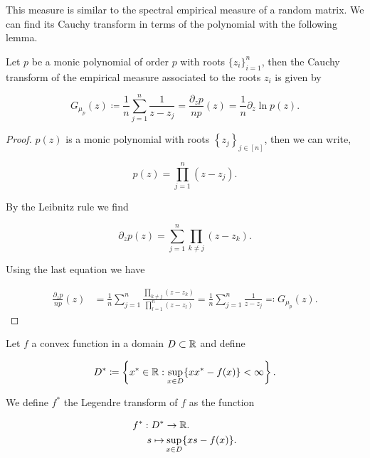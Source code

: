 This measure is similar to the spectral empirical measure of a random matrix. We can find its Cauchy transform in terms of the polynomial with the following lemma.

\begin{lemma} \label{lemma:cauchy_empirical_polynomial}
    Let $p$ be a monic polynomial of order $p$ with roots $\{z_i\}_{i=1}^n$, then the Cauchy transform of the empirical measure associated to the roots $z_i$ is given by 

    \begin{equation*}
        G_{\mu_p}(z) \coloneqq \frac1n \sum_{j=1}^n \frac1{z - z_j} = \frac{\partial_z p }{n p}(z) = \frac1n \partial_z \ln p(z).
    \end{equation*}

\end{lemma}

\begin{proof}
    $p(z)$ is a monic polynomial with roots $\left\{ z_j \right\}_{j \in [n]}$, then we can write,

    \begin{equation*}
        p(z) = \prod_{j=1}^n (z-z_j).
    \end{equation*}

    By the Leibnitz rule we find

    \begin{equation*}
        \partial_z p(z) = \sum_{j=1}^n \prod_{k\neq j} (z-z_k).
    \end{equation*}

    Using the last equation we have

    \begin{align*}
        \frac{\partial_z p}{n p}(z) &= \frac1n\sum_{j=1}^n \frac{\prod_{k\neq j} (z-z_k) }{ \prod_{l=1}^n (z-z_l) } = \frac1n\sum_{j=1}^n \frac{1}{z - z_j} \eqqcolon G_{\mu_p}(z).
    \end{align*}
\end{proof}

\begin{definition}
    Let $f$ a convex function in a domain $D\subset \mathbb R$ and define

    \begin{equation} \label{eq:legendre_set}
        D^* \coloneqq \left\{ x^* \in \mathbb R \mathrel{:} \sup_{x \in D} \{xx^* - f(x)\} < \infty \right\}.
    \end{equation}

    We define $f^*$ the Legendre transform of $f$ as the function

    \begin{align*}
        f^* : D^* &\to \mathbb R.\\
        s \mapsto &\sup_{x \in D} \{ xs - f(x) \}.
    \end{align*}
\end{definition}

